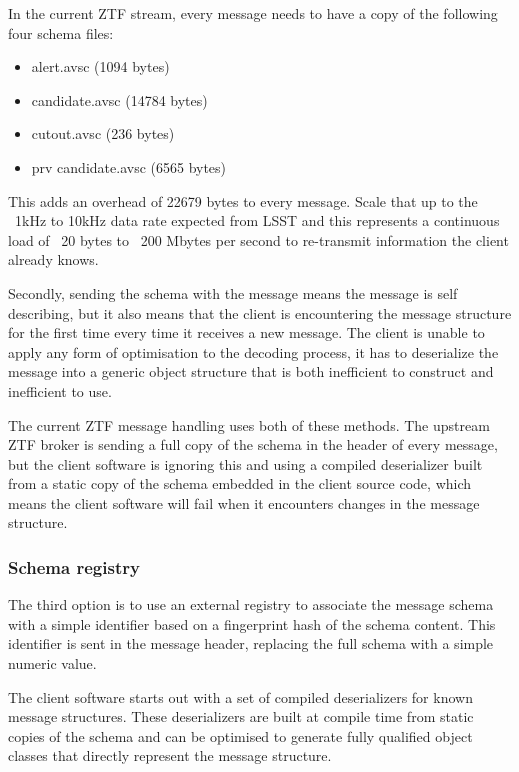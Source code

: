\documentclass{article}
\newcommand{\deserz}    {deserialize\xspace}
\newcommand{\deserzer}  {deserializer\xspace}
\newcommand{\deserzers} {deserializers\xspace}
\begin{document}
In the current ZTF stream, every message needs to have a copy of the following four schema files:

\begin{itemize}
  \item alert.avsc (1094 bytes)
  \item candidate.avsc (14784 bytes)
  \item cutout.avsc (236 bytes)
  \item prv candidate.avsc (6565 bytes)
\end{itemize}

This adds an overhead of 22679 bytes to every message. Scale that up to the ~1kHz to 10kHz data rate expected from LSST and this represents a continuous load of ~20 bytes to ~200 Mbytes per second to re-transmit information the client already knows.

Secondly, sending the schema with the message means the message is self describing, but it also means that the client is encountering the message structure for the first time every time it receives a new message.
The client is unable to apply any form of optimisation to the decoding process, it has to \deserz the message into a generic object structure that is both inefficient to construct and inefficient to use.

The current ZTF message handling uses both of these methods.
The upstream ZTF broker is sending a full copy of the schema in the header of every message, but the client software is ignoring this and using a compiled \deserzer built from a static copy of the schema embedded in the client source code, which means the client software will fail when it encounters changes in the message structure.

\subsubsection{Schema registry}
\label{avro-schema-registry}

The third option is to use an external registry to associate the message schema with a simple identifier based on a fingerprint hash of the schema content. This identifier is sent in the message header, replacing the full schema with a simple numeric value.

The client software starts out with a set of compiled \deserzers for known message structures.
These \deserzers are built at compile time from static copies of the schema and can be optimised to generate fully qualified object classes that directly represent the message structure.
\end{document}
